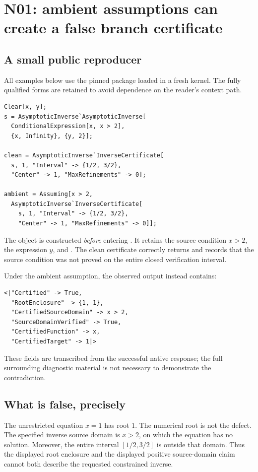 \documentclass[11pt,letterpaper]{article}
\newcommand{\code}[1]{\texttt{\detokenize{#1}}}
\begin{document}
\section{N01: ambient assumptions can create a false branch certificate}\label{sec:n01}
\subsection{A small public reproducer}
All examples below use the pinned package loaded in a fresh kernel. The fully qualified forms are retained to avoid dependence on the reader's context path.
\begin{lstlisting}
Clear[x, y];
s = AsymptoticInverse`AsymptoticInverse[
  ConditionalExpression[x, x > 2],
  {x, Infinity}, {y, 2}];

clean = AsymptoticInverse`InverseCertificate[
  s, 1, "Interval" -> {1/2, 3/2},
  "Center" -> 1, "MaxRefinements" -> 0];

ambient = Assuming[x > 2,
  AsymptoticInverse`InverseCertificate[
    s, 1, "Interval" -> {1/2, 3/2},
    "Center" -> 1, "MaxRefinements" -> 0]];
\end{lstlisting}
The object is constructed \emph{before} entering \code{Assuming}. It retains the source condition $x>2$, the expression $y$, and \code{Assumptions -> True}. The clean certificate correctly returns \code{Failure["OutsideBranch",...]} and records that the source condition was not proved on the entire closed verification interval.

Under the ambient assumption, the observed output instead contains:
\begin{lstlisting}
<|"Certified" -> True,
  "RootEnclosure" -> {1, 1},
  "CertifiedSourceDomain" -> x > 2,
  "SourceDomainVerified" -> True,
  "CertifiedFunction" -> x,
  "CertifiedTarget" -> 1|>
\end{lstlisting}
These fields are transcribed from the successful native response; the full surrounding diagnostic material is not necessary to demonstrate the contradiction.

\subsection{What is false, precisely}
The unrestricted equation $x=1$ has root $1$. The numerical root is not the defect. The specified inverse source domain is $x>2$, on which the equation has no solution. Moreover, the entire interval $[1/2,3/2]$ is outside that domain. Thus the displayed root enclosure and the displayed positive source-domain claim cannot both describe the requested constrained inverse.
\end{document}
